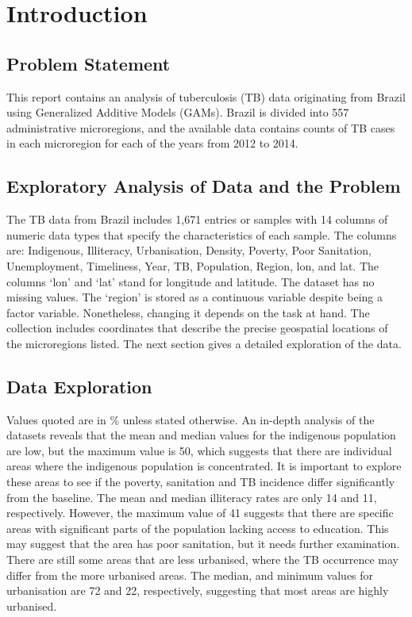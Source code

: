 \section{Introduction}

\subsection{Problem Statement}
This report contains an analysis of tuberculosis (TB) data originating from Brazil using Generalized Additive Models (GAMs). Brazil is divided into 557 administrative microregions, and the available data
contains counts of TB cases in each microregion for each of the years from 2012 to 2014.

\subsection{Exploratory Analysis of Data and the Problem}

The TB data from Brazil includes 1,671 entries or samples with 14 columns of numeric data types that specify the characteristics of each sample. The columns are: Indigenous, Illiteracy, Urbanisation, Density, Poverty, Poor Sanitation, Unemployment, Timeliness, Year, TB, Population, Region, lon, and lat. The columns `lon' and `lat' stand for longitude and latitude. The dataset has no missing values. The `region' is stored as a continuous variable despite being a factor variable. Nonetheless, changing it depends on the task at hand. The collection includes coordinates that describe the precise geospatial locations of the microregions listed. The next section gives a detailed exploration of  the data.

\subsection{Data Exploration}

Values quoted are in \% unless stated otherwise. An in-depth analysis of the datasets reveals that the mean and median values for the indigenous population are low, but the maximum value is 50, which suggests that there are individual areas where the indigenous population is concentrated. It is important to explore these areas to see if the poverty, sanitation and TB incidence differ significantly from the baseline. The mean and median illiteracy rates are only 14 and 11, respectively. However, the maximum value of 41 suggests that there are specific areas with significant parts of the population lacking access to education. This may suggest that the area has poor sanitation, but it needs further examination. There are still some areas that are less urbanised, where the TB occurrence may differ from the more urbanised areas. The median, and minimum values for urbanisation are 72 and 22, respectively, suggesting that most areas are highly urbanised.

